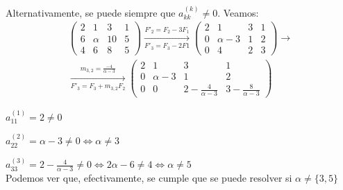 \documentclass[12pt]{article}
\begin{document}
\begin{ejercicio} 
    Alternativamente, se puede siempre que $a_{kk}^{(k)} \neq 0$. Veamos:
    \begin{multline*}
        \left(\begin{array}{ccc|c}
            2 & 1 & 3 & 1\\
            6 & \alpha & 10 & 5 \\
            4 & 6 & 8 & 5   
        \end{array} \right)
        \xrightarrow[F'_3=F_3-2F1]{F'_2=F_2-3F_1}
        \left(\begin{array}{ccc|c}
            2 & 1 & 3 & 1\\
            0 & \alpha-3 & 1 & 2 \\
            0 & 4 & 2 & 3   
        \end{array} \right)
        \longrightarrow \\
        \xrightarrow[F'_3=F_3+m_{3,2}F_2]{m_{3,2}=\frac{-4}{\alpha-3}}
        \left(\begin{array}{ccc|c}
            2 & 1 & 3 & 1\\
            0 & \alpha-3 & 1 & 2 \\
            0 & 0 & 2-\frac{4}{\alpha-3} & 3-\frac{8}{\alpha-3}
        \end{array} \right)
    \end{multline*}

    $a_{11}^{(1)}=2\neq 0$
    
    $a_{22}^{(2)}=\alpha- 3\neq 0 \Longleftrightarrow \alpha \neq 3$
    
    $a_{33}^{(3)}=2-\frac{4}{\alpha-3}\neq 0 \Longleftrightarrow 2\alpha-6\neq 4 \Longleftrightarrow \alpha\neq 5$\\
    
    Podemos ver que, efectivamente, se cumple que se puede resolver si $\alpha\neq \{3,5\}$
\end{ejercicio}
\end{document}
